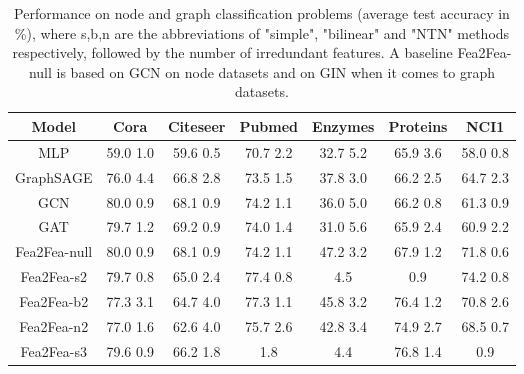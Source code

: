 \documentclass[runningheads]{llncs}
\newcommand{\B}{\fontseries{b}\selectfont}
\begin{document}
  \begin{table}\scriptsize
    \centering
    \caption{Performance on node and graph classification problems (average test accuracy in \%), where s,b,n are the abbreviations of "simple", "bilinear" and "NTN" methods respectively, followed by the number of irredundant features. A baseline Fea2Fea-null is based on GCN on node datasets and on GIN when it comes to graph datasets.}
    \vspace{-0.3cm}
    \begin{tabular}{*{7}{c}} \toprule
  {Model}  & \multicolumn{1}{c}{{\sc Cora}} & \multicolumn{1}{c}{{\sc Citeseer}} & \multicolumn{1}{c}{{\sc Pubmed}}  & \multicolumn{1}{c}{{\sc Enzymes}} & \multicolumn{1}{c}{{\sc Proteins}}  & \multicolumn{1}{c}{{\sc NCI1}}   \\ \hline



  MLP           & 59.0  1.0& 59.6  0.5 & 70.7  2.2  & 32.7   5.2 & 65.9  3.6   & 58.0  0.8   \\
  GraphSAGE       &  76.0  4.4&  66.8  2.8 & 73.5  1.5 & 37.8  3.0  &  66.2  2.5  & 64.7  2.3   \\
  GCN             & 80.0  0.9 & 68.1  0.9 & 74.2  1.1 & 36.0  5.0  &  66.2  0.8  & 61.3  0.9  \\
  GAT             & 79.7  1.2 & 69.2  0.9 &  74.0  1.4 &  31.0  5.6  &   65.9  2.4  & 60.9  2.2 \\          
  Fea2Fea-null    & 80.0  0.9 & 68.1  0.9 & 74.2  1.1 & 47.2  3.2 & 67.9  1.2  & 71.8   0.6 \\ \hline
  Fea2Fea-s2       & 79.7  0.8 &  65.0  2.4 & 77.4  0.8 & \B48.5  4.5  &\B77.8  0.9  &  74.2  0.8       \\
  Fea2Fea-b2   & 77.3   3.1 & 64.7  4.0 &77.3  1.1& 45.8  3.2  & 76.4  1.2  & 70.8  2.6\\
  Fea2Fea-n2  & 77.0   1.6 & 62.6  4.0 & 75.7  2.6  & 42.8  3.4 & 74.9  2.7 & 68.5  0.7\\
  Fea2Fea-s3       & 79.6  0.9  &66.2   1.8 & \B78.5  1.8  &  \B48.0  4.4  & 76.8  1.4 & \B74.9  0.9   \\           \hline

    
  \bottomrule
    \end{tabular}
  \end{table} 
\end{document}
